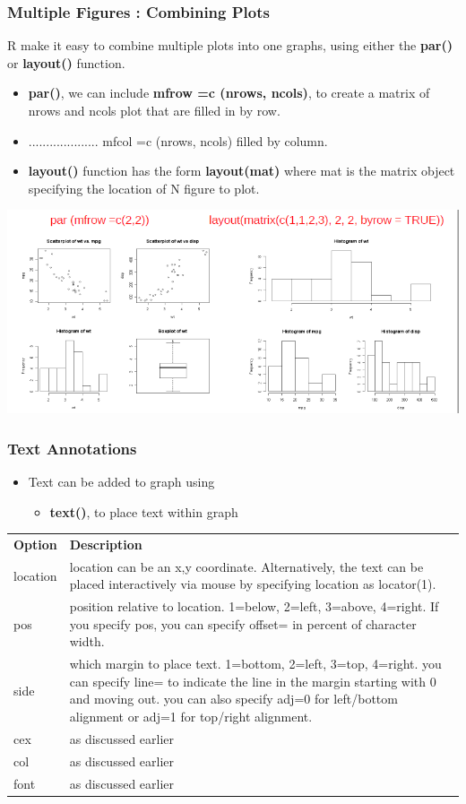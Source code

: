 \documentclass[12pt]{beamer}
\begin{document}
\begin{frame}
\frametitle{Multiple Figures : Combining Plots}
R make it easy to combine multiple plots into one graphs, using either the \textbf{par()} or
\textbf{layout()} function.
\begin{itemize}
	\item  \textbf{par()}, we can include\textbf{ mfrow =c (nrows, ncols)}, to create a matrix of
	nrows and ncols plot that are filled in by row.
	\item   .................... mfcol =c (nrows, ncols) filled by column.
	\item  \textbf{layout()} function has the form \textbf{layout(mat)} where mat is the matrix
	object specifying the location of N figure to plot.
\end{itemize}
\includegraphics[scale=0.35]{multifig}
\end{frame}


\begin{frame}
\frametitle{Text Annotations}
\begin{itemize}
	\item Text can be added to graph using
	\begin{itemize}
		\item \textbf{text()}, to place text within graph
	\end{itemize}
\end{itemize}
\begin{tabular}{lp{}}
	\textbf{Option} &\textbf{Description}\\
	location &location can be an x,y coordinate. Alternatively, the text can be
	placed interactively via mouse by specifying location as locator(1).\\
	pos &position relative to location. 1=below, 2=left, 3=above, 4=right. If
	you specify pos, you can specify offset= in percent of character
	width.\\
	side &which margin to place text. 1=bottom, 2=left, 3=top, 4=right. you
	can specify line= to indicate the line in the margin starting with 0
	and moving out. you can also specify adj=0 for left/bottom
	alignment or adj=1 for top/right alignment.\\
	cex & as discussed earlier \\
	col & as discussed earlier \\
	font & as discussed earlier \\
\end{tabular}
\end{frame}
\end{document}

